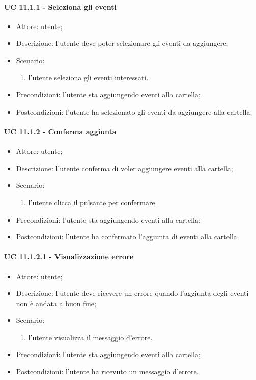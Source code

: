     \paragraph{UC 11.1.1 - Seleziona gli eventi} \label{sec: UC 11.1.1}
    \begin{itemize}
        \item Attore: utente;
        \item Descrizione: l'utente deve poter selezionare gli eventi da aggiungere;
        \item Scenario:
        \begin{enumerate}
        \item l'utente seleziona gli eventi interessati.
        \end{enumerate}
        \item Precondizioni: l'utente sta aggiungendo eventi alla cartella;
        \item Postcondizioni: l'utente ha selezionato gli eventi da aggiungere alla cartella.
    \end{itemize}
    \paragraph{UC 11.1.2 - Conferma aggiunta} \label{sec: UC 11.1.2}
    \begin{itemize}
        \item Attore: utente;
        \item Descrizione: l'utente conferma di voler aggiungere eventi alla cartella;
        \item Scenario:
        \begin{enumerate}
        \item l'utente clicca il pulsante per confermare.
        \end{enumerate}
        \item Precondizioni: l'utente sta aggiungendo eventi alla cartella;
        \item Postcondizioni: l'utente ha confermato l'aggiunta di eventi alla cartella.
    \end{itemize}
    \paragraph{UC 11.1.2.1 - Visualizzazione errore} \label{sec: UC 11.1.2.1}
    \begin{itemize}
        \item Attore: utente;
        \item Descrizione: l'utente deve ricevere un errore quando l'aggiunta degli eventi non è andata a buon fine;
        \item Scenario:
        \begin{enumerate}
        \item l'utente visualizza il messaggio d'errore.
        \end{enumerate}   
        \item Precondizioni: l'utente sta aggiungendo eventi alla cartella;
        \item Postcondizioni: l'utente ha ricevuto un messaggio d'errore.
    \end{itemize}

